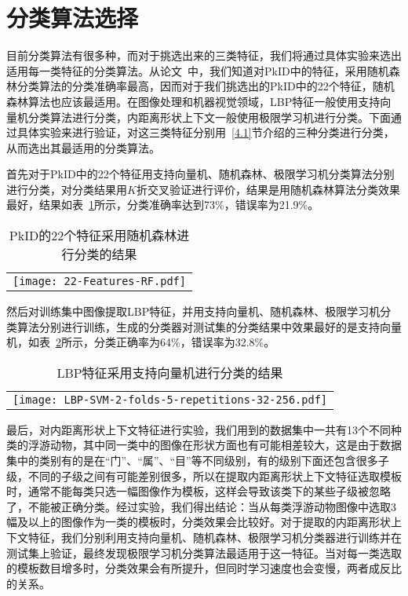 \section{分类算法选择}

目前分类算法有很多种，而对于挑选出来的三类特征，我们将通过具体实验来选出适用每一类特征的分类算法。从论文~\cite{gorsky2010digital}中，我们知道对PkID中的特征，采用随机森林分类算法的分类准确率最高，因而对于我们挑选出的PkID中的22个特征，随机森林算法也应该最适用。在图像处理和机器视觉领域，LBP特征一般使用支持向量机分类算法进行分类，内距离形状上下文一般使用极限学习机进行分类。下面通过具体实验来进行验证，对这三类特征分别用~\ref{4.1}节介绍的三种分类进行分类，从而选出其最适用的分类算法。

首先对于PkID中的22个特征用支持向量机、随机森林、极限学习机分类算法分别进行分类，对分类结果用$K$折交叉验证进行评价，结果是用随机森林算法分类效果最好，结果如表~\ref{22-Features-RF}所示，分类准确率达到73\%，错误率为21.9\%。

\begin{table}
\centering
\caption{PkID的22个特征采用随机森林进行分类的结果}
\begin{tabular}{c}
\texttt{[image: 22-Features-RF.pdf]}
\end{tabular}
\label{22-Features-RF}
\end{table}

然后对训练集中图像提取LBP特征，并用支持向量机、随机森林、极限学习机分类算法分别进行训练，生成的分类器对测试集的分类结果中效果最好的是支持向量机，如表~\ref{LBP-SVM-2-folds-5-repetitions-32-256}所示，分类正确率为64\%，错误率为32.8\%。

\begin{table}
\centering
\caption{LBP特征采用支持向量机进行分类的结果}
\begin{tabular}{c}
\texttt{[image: LBP-SVM-2-folds-5-repetitions-32-256.pdf]}
\end{tabular}
\label{LBP-SVM-2-folds-5-repetitions-32-256}
\end{table}

最后，对内距离形状上下文特征进行实验，我们用到的数据集中一共有13个不同种类的浮游动物，其中同一类中的图像在形状方面也有可能相差较大，这是由于数据集中的类别有的是在“门”、“属”、“目”等不同级别，有的级别下面还包含很多子级，不同的子级之间有可能差别很多，所以在提取内距离形状上下文特征选取模板时，通常不能每类只选一幅图像作为模板，这样会导致该类下的某些子级被忽略了，不能被正确分类。经过实验，我们得出结论：当从每类浮游动物图像中选取3幅及以上的图像作为一类的模板时，分类效果会比较好。对于提取的内距离形状上下文特征，我们分别利用支持向量机、随机森林、极限学习机分类器进行训练并在测试集上验证，最终发现极限学习机分类算法最适用于这一特征。当对每一类选取的模板数目增多时，分类效果会有所提升，但同时学习速度也会变慢，两者成反比的关系。

